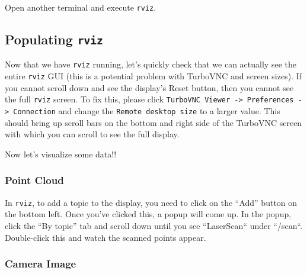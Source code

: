 \documentclass{article}
\begin{document}

Open another terminal and execute \texttt{rviz}.

\subsection{Populating \texttt{rviz}}

Now that we have \texttt{rviz} running, let's quickly check that we can actually see the entire \texttt{rviz} GUI (this is a potential problem with TurboVNC and screen sizes). If you cannot scroll down and see the display's Reset button, then you cannot see the full \texttt{rviz} screen. To fix this, please click \texttt{TurboVNC Viewer -> Preferences -> Connection} and change the \texttt{Remote desktop size} to a larger value. This should bring up scroll bars on the bottom and right side of the TurboVNC screen with which you can scroll to see the full display.

Now let's visualize some data!!

\subsubsection{Point Cloud}




In \texttt{rviz}, to add a topic to the display, you need to click on the ``Add'' button on the bottom left. Once you've clicked this, a popup will come up. In the popup, click the ``By topic'' tab and scroll down until you see ``LaserScan`` under ``/scan``. Double-click this and watch the scanned points appear.

\subsubsection{Camera Image}

\end{document}
